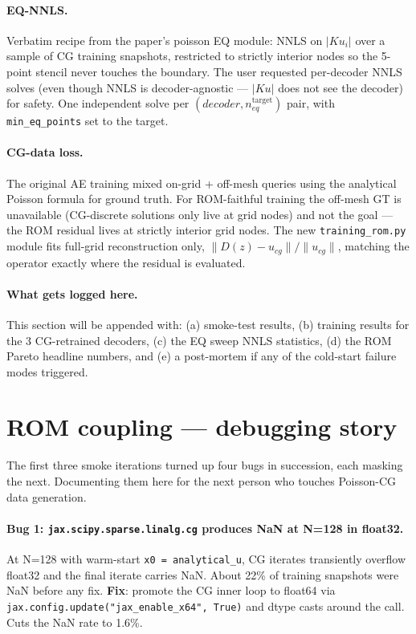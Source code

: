 \documentclass[11pt]{article}
\begin{document}
\paragraph{EQ-NNLS.}
Verbatim recipe from the paper's poisson EQ module:
NNLS on $|K u_i|$ over a sample of CG training snapshots, restricted
to strictly interior nodes so the 5-point stencil never touches the
boundary. The user requested per-decoder NNLS solves (even though NNLS
is decoder-agnostic --- $|Ku|$ does not see the decoder) for safety.
One independent solve per $(decoder, n_{eq}^{\text{target}})$ pair,
with \texttt{min\_eq\_points} set to the target.

\paragraph{CG-data loss.}
The original AE training mixed on-grid + off-mesh queries using the
analytical Poisson formula for ground truth. For ROM-faithful training
the off-mesh GT is unavailable (CG-discrete solutions only live at
grid nodes) and not the goal --- the ROM residual lives at strictly
interior grid nodes. The new \texttt{training\_rom.py} module fits
full-grid reconstruction only, $\|D(z) - u_{cg}\| / \|u_{cg}\|$,
matching the operator exactly where the residual is evaluated.

\paragraph{What gets logged here.}
This section will be appended with: (a) smoke-test results, (b)
training results for the 3 CG-retrained decoders, (c) the EQ sweep
NNLS statistics, (d) the ROM Pareto headline numbers, and (e) a
post-mortem if any of the cold-start failure modes triggered.

\section{ROM coupling --- debugging story}

The first three smoke iterations turned up four bugs in succession,
each masking the next. Documenting them here for the next person who
touches Poisson-CG data generation.

\paragraph{Bug 1: \texttt{jax.scipy.sparse.linalg.cg} produces NaN at
N=128 in float32.}
At N=128 with warm-start \texttt{x0 = analytical\_u}, CG iterates
transiently overflow float32 and the final iterate carries NaN. About
22\% of training snapshots were NaN before any fix. \textbf{Fix}:
promote the CG inner loop to float64 via
\texttt{jax.config.update("jax\_enable\_x64", True)} and dtype casts
around the call. Cuts the NaN rate to 1.6\%.
\end{document}
